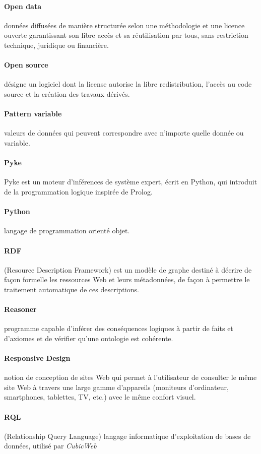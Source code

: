 \documentclass {report}
\begin{document}
\paragraph{Open data}données diffusées de manière structurée selon une méthodologie et une licence ouverte garantissant son libre accès et sa réutilisation par tous, sans restriction technique, juridique ou financière.
\paragraph{Open source}désigne un logiciel dont la license autorise la libre redistribution, l'accès au code source et la création des travaux dérivés.
\paragraph{Pattern variable}valeurs de données qui peuvent correspondre avec n'importe quelle donnée ou variable.
\paragraph{Pyke}Pyke est un moteur d'inférences de système expert, écrit en Python, qui introduit de la programmation logique inspirée de Prolog.
\paragraph{Python}langage de programmation orienté objet.
\paragraph{RDF}(Resource Description Framework) est un modèle de graphe destiné à décrire de façon formelle les ressources Web et leurs métadonnées, de façon à permettre le traitement automatique de ces descriptions.
\paragraph{Reasoner}programme capable d'inférer des conséquences logiques à partir de faits et d'axiomes et de vérifier qu'une ontologie est cohérente.
\paragraph{Responsive Design}notion de conception de sites Web qui permet à l'utilisateur de consulter le même site Web à travers une large gamme d'appareils (moniteurs d'ordinateur, smartphones, tablettes, TV, etc.) avec le même confort visuel.
\paragraph{RQL}(Relationship Query Language) langage informatique d'exploitation de bases de données, utilisé par \textit{CubicWeb}
\end{document}
